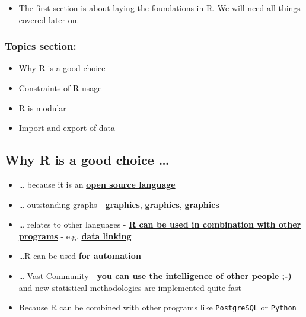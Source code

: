\documentclass[10pt,]{article}
\providecommand{\tightlist}{%
  \setlength{\itemsep}{0pt}\setlength{\parskip}{0pt}}
\begin{document}
\begin{itemize}
\tightlist
\item
  The first section is about laying the foundations in R. We will need
  all things covered later on.
\end{itemize}

\subsubsection{Topics section:}\label{topics-section}

\begin{itemize}
\tightlist
\item
  Why R is a good choice
\item
  Constraints of R-usage
\item
  R is modular
\item
  Import and export of data
\end{itemize}

\subsection{Why R is a good choice
\ldots{}}\label{why-r-is-a-good-choice}

\begin{itemize}
\tightlist
\item
  \ldots{} because it is an
  \href{https://stackoverflow.com/questions/1546583/what-is-the-definition-of-an-open-source-programming-language}{\textbf{open
  source language}}
\item
  \ldots{} outstanding graphs -
  \href{http://matthewlincoln.net/2014/12/20/adjacency-matrix-plots-with-r-and-ggplot2.html}{\textbf{graphics}},
  \href{https://www.r-bloggers.com/3d-plots-with-ggplot2-and-plotly\%20/}{\textbf{graphics}},
  \href{https://procomun.wordpress.com/2011/03/18/splomr/}{\textbf{graphics}}
\item
  \ldots{} relates to other languages -
  \href{https://github.com/Japhilko/RInterfaces}{\textbf{R can be used
  in combination with other programs}} - e.g.
  \href{https://github.com/Japhilko/RInterfaces/blob/master/slides/Datenimport.md}{\textbf{data
  linking}}
\item
  \ldots{}R can be used
  \href{https://cran.r-project.org/web/packages/MplusAutomation/index.html}{\textbf{for
  automation}}
\item
  \ldots{} Vast Community -
  \href{https://www.r-bloggers.com/}{\textbf{you can use the
  intelligence of other people ;-)}} and new statistical methodologies
  are implemented quite fast
\item
  Because R can be combined with other programs like \texttt{PostgreSQL}
  or \texttt{Python}
\end{itemize}
\end{document}
